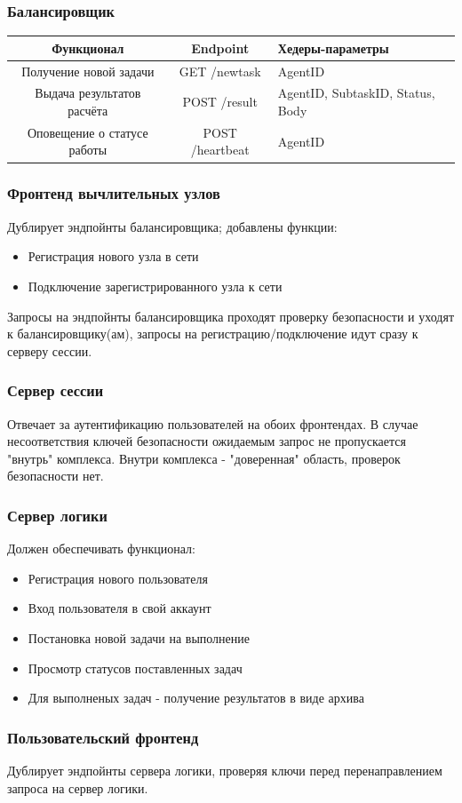 \documentclass[a4paper,12pt]{report}
\numberwithin{equation}{section}
\begin{document}
\subsubsection{Балансировщик}
\begin{tabu}{|c|c|X[c]|}
  \hline
          Функционал          &    Endpoint     & Хедеры-параметры                 \\ \hline
    Получение новой задачи    &  GET /newtask   & AgentID                          \\ \hline
  Выдача результатов расчёта  &  POST /result   & AgentID, SubtaskID, Status, Body \\ \hline
  Оповещение о статусе работы & POST /heartbeat & AgentID                          \\ \hline
\end{tabu}

\subsubsection{Фронтенд вычлительных узлов}
Дублирует эндпойнты балансировщика; добавлены функции:
\begin{itemize}
  \item Регистрация нового узла в сети
  \item Подключение зарегистрированного узла к сети
\end{itemize}
Запросы на эндпойнты балансировщика проходят проверку безопасности и уходят к балансировщику(ам), запросы на регистрацию/подключение идут сразу к серверу сессии.

\subsubsection{Сервер сессии}
Отвечает за аутентификацию пользователей на обоих фронтендах. 
В случае несоответствия ключей безопасности ожидаемым запрос не пропускается "внутрь" комплекса.
Внутри комплекса - "доверенная" область, проверок безопасности нет.

\subsubsection{Сервер логики}
Должен обеспечивать функционал:
\begin{itemize}
  \item Регистрация нового пользователя
  \item Вход пользователя в свой аккаунт
  \item Постановка новой задачи на выполнение
  \item Просмотр статусов поставленных задач
  \item Для выполненых задач - получение результатов в виде архива
\end{itemize}

\subsubsection{Пользовательский фронтенд}
Дублирует эндпойнты сервера логики, проверяя ключи перед перенаправлением запроса на сервер логики.
\end{document}

